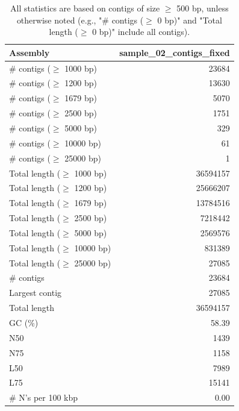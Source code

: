 \documentclass[12pt,a4paper]{article}
\begin{document}
\begin{table}[ht]
\begin{center}
\caption{All statistics are based on contigs of size $\geq$ 500 bp, unless otherwise noted (e.g., "\# contigs ($\geq$ 0 bp)" and "Total length ($\geq$ 0 bp)" include all contigs).}
\begin{tabular}{|l*{1}{|r}|}
\hline
Assembly & sample\_02\_contigs\_fixed \\ \hline
\# contigs ($\geq$ 1000 bp) & 23684 \\ \hline
\# contigs ($\geq$ 1200 bp) & 13630 \\ \hline
\# contigs ($\geq$ 1679 bp) & 5070 \\ \hline
\# contigs ($\geq$ 2500 bp) & 1751 \\ \hline
\# contigs ($\geq$ 5000 bp) & 329 \\ \hline
\# contigs ($\geq$ 10000 bp) & 61 \\ \hline
\# contigs ($\geq$ 25000 bp) & 1 \\ \hline
Total length ($\geq$ 1000 bp) & 36594157 \\ \hline
Total length ($\geq$ 1200 bp) & 25666207 \\ \hline
Total length ($\geq$ 1679 bp) & 13784516 \\ \hline
Total length ($\geq$ 2500 bp) & 7218442 \\ \hline
Total length ($\geq$ 5000 bp) & 2569576 \\ \hline
Total length ($\geq$ 10000 bp) & 831389 \\ \hline
Total length ($\geq$ 25000 bp) & 27085 \\ \hline
\# contigs & 23684 \\ \hline
Largest contig & 27085 \\ \hline
Total length & 36594157 \\ \hline
GC (\%) & 58.39 \\ \hline
N50 & 1439 \\ \hline
N75 & 1158 \\ \hline
L50 & 7989 \\ \hline
L75 & 15141 \\ \hline
\# N's per 100 kbp & 0.00 \\ \hline
\end{tabular}
\end{center}
\end{table}
\end{document}
